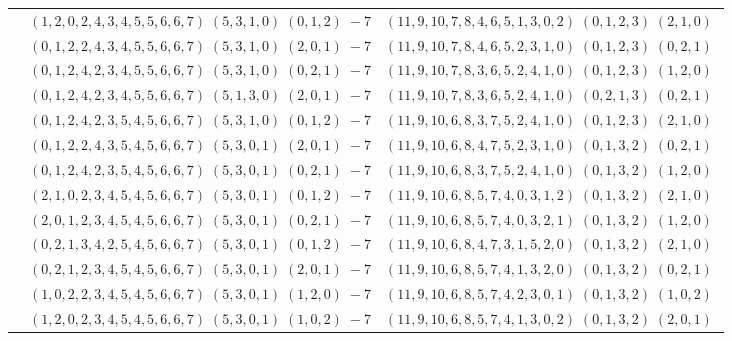 \documentclass[11pt]{article}
\begin{document}
\begin{longtable}[l]{|c|c|c|}
 \cline{2-3} 
 & $(1 ,2 ,0 ,2 ,4 ,3 ,4 ,5 ,5 ,6 ,6 ,7) \;(5 ,3 ,1 ,0) \;(0 ,1 ,2) \;-7$ & $(11 ,9 ,10 ,7 ,8 ,4 ,6 ,5 ,1 ,3 ,0 ,2) \;(0 ,1 ,2 ,3) \;(2 ,1 ,0) \;$\\ 
 \cline{2-3} 
 & $(0 ,1 ,2 ,2 ,4 ,3 ,4 ,5 ,5 ,6 ,6 ,7) \;(5 ,3 ,1 ,0) \;(2 ,0 ,1) \;-7$ & $(11 ,9 ,10 ,7 ,8 ,4 ,6 ,5 ,2 ,3 ,1 ,0) \;(0 ,1 ,2 ,3) \;(0 ,2 ,1) \;$\\ 
 \cline{2-3} 
 & $(0 ,1 ,2 ,4 ,2 ,3 ,4 ,5 ,5 ,6 ,6 ,7) \;(5 ,3 ,1 ,0) \;(0 ,2 ,1) \;-7$ & $(11 ,9 ,10 ,7 ,8 ,3 ,6 ,5 ,2 ,4 ,1 ,0) \;(0 ,1 ,2 ,3) \;(1 ,2 ,0) \;$\\ 
 \cline{2-3} 
 & $(0 ,1 ,2 ,4 ,2 ,3 ,4 ,5 ,5 ,6 ,6 ,7) \;(5 ,1 ,3 ,0) \;(2 ,0 ,1) \;-7$ & $(11 ,9 ,10 ,7 ,8 ,3 ,6 ,5 ,2 ,4 ,1 ,0) \;(0 ,2 ,1 ,3) \;(0 ,2 ,1) \;$\\ 
 \cline{2-3} 
 & $(0 ,1 ,2 ,4 ,2 ,3 ,5 ,4 ,5 ,6 ,6 ,7) \;(5 ,3 ,1 ,0) \;(0 ,1 ,2) \;-7$ & $(11 ,9 ,10 ,6 ,8 ,3 ,7 ,5 ,2 ,4 ,1 ,0) \;(0 ,1 ,2 ,3) \;(2 ,1 ,0) \;$\\ 
 \cline{2-3} 
 & $(0 ,1 ,2 ,2 ,4 ,3 ,5 ,4 ,5 ,6 ,6 ,7) \;(5 ,3 ,0 ,1) \;(2 ,0 ,1) \;-7$ & $(11 ,9 ,10 ,6 ,8 ,4 ,7 ,5 ,2 ,3 ,1 ,0) \;(0 ,1 ,3 ,2) \;(0 ,2 ,1) \;$\\ 
 \cline{2-3} 
 & $(0 ,1 ,2 ,4 ,2 ,3 ,5 ,4 ,5 ,6 ,6 ,7) \;(5 ,3 ,0 ,1) \;(0 ,2 ,1) \;-7$ & $(11 ,9 ,10 ,6 ,8 ,3 ,7 ,5 ,2 ,4 ,1 ,0) \;(0 ,1 ,3 ,2) \;(1 ,2 ,0) \;$\\ 
 \cline{2-3} 
 & $(2 ,1 ,0 ,2 ,3 ,4 ,5 ,4 ,5 ,6 ,6 ,7) \;(5 ,3 ,0 ,1) \;(0 ,1 ,2) \;-7$ & $(11 ,9 ,10 ,6 ,8 ,5 ,7 ,4 ,0 ,3 ,1 ,2) \;(0 ,1 ,3 ,2) \;(2 ,1 ,0) \;$\\ 
 \cline{2-3} 
 & $(2 ,0 ,1 ,2 ,3 ,4 ,5 ,4 ,5 ,6 ,6 ,7) \;(5 ,3 ,0 ,1) \;(0 ,2 ,1) \;-7$ & $(11 ,9 ,10 ,6 ,8 ,5 ,7 ,4 ,0 ,3 ,2 ,1) \;(0 ,1 ,3 ,2) \;(1 ,2 ,0) \;$\\ 
 \cline{2-3} 
 & $(0 ,2 ,1 ,3 ,4 ,2 ,5 ,4 ,5 ,6 ,6 ,7) \;(5 ,3 ,0 ,1) \;(0 ,1 ,2) \;-7$ & $(11 ,9 ,10 ,6 ,8 ,4 ,7 ,3 ,1 ,5 ,2 ,0) \;(0 ,1 ,3 ,2) \;(2 ,1 ,0) \;$\\ 
 \cline{2-3} 
 & $(0 ,2 ,1 ,2 ,3 ,4 ,5 ,4 ,5 ,6 ,6 ,7) \;(5 ,3 ,0 ,1) \;(2 ,0 ,1) \;-7$ & $(11 ,9 ,10 ,6 ,8 ,5 ,7 ,4 ,1 ,3 ,2 ,0) \;(0 ,1 ,3 ,2) \;(0 ,2 ,1) \;$\\ 
 \cline{2-3} 
 & $(1 ,0 ,2 ,2 ,3 ,4 ,5 ,4 ,5 ,6 ,6 ,7) \;(5 ,3 ,0 ,1) \;(1 ,2 ,0) \;-7$ & $(11 ,9 ,10 ,6 ,8 ,5 ,7 ,4 ,2 ,3 ,0 ,1) \;(0 ,1 ,3 ,2) \;(1 ,0 ,2) \;$\\ 
 \cline{2-3} 
 & $(1 ,2 ,0 ,2 ,3 ,4 ,5 ,4 ,5 ,6 ,6 ,7) \;(5 ,3 ,0 ,1) \;(1 ,0 ,2) \;-7$ & $(11 ,9 ,10 ,6 ,8 ,5 ,7 ,4 ,1 ,3 ,0 ,2) \;(0 ,1 ,3 ,2) \;(2 ,0 ,1) \;$\\ 

\end{longtable}
\end{document}

